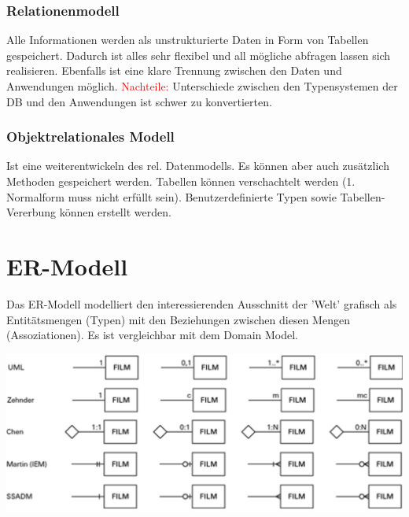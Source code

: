 \documentclass[10pt,landscape,a4paper]{scrartcl}
\begin{document}
\begin{multicols*}{5}
\subsubsection{Relationenmodell}
Alle Informationen werden als unstrukturierte Daten in Form von \textcolor{b}{Tabellen} gespeichert. Dadurch ist alles \textcolor{b}{sehr flexibel} und all mögliche abfragen lassen sich realisieren. Ebenfalls ist eine \textcolor{b}{klare Trennung} zwischen den Daten und Anwendungen möglich.
\textcolor{red}{Nachteile:} Unterschiede zwischen den Typensystemen der DB und den Anwendungen ist schwer zu konvertierten. 
\subsubsection{Objektrelationales Modell}
Ist eine weiterentwickeln des rel. Datenmodells. Es können aber auch zusätzlich \textcolor{b}{Methoden} gespeichert werden. Tabellen können verschachtelt werden (1. Normalform muss nicht erfüllt sein). Benutzerdefinierte Typen sowie Tabellen-Vererbung können erstellt werden.
\columnbreak

\section{ER-Modell}
Das ER-Modell modelliert den interessierenden Ausschnitt der 'Welt' grafisch als Entitätsmengen (Typen) mit den Beziehungen zwischen diesen Mengen (Assoziationen). Es ist vergleichbar mit dem Domain Model.
	\vspace{-15pt}
\begin{center}
	\includegraphics[scale=.17]{Graphic/Vergleich_notationen}
\end{center}
	\vspace{-15pt}

\end{multicols*}
\end{document}
